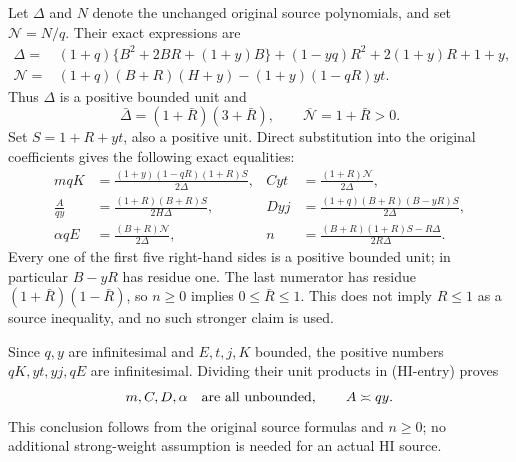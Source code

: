 Let $\Delta$ and $N$ denote the unchanged original source
polynomials, and set $\mathcal N=N/q$. Their exact expressions are
\begin{align*}
\Delta={}&(1+q)\{B^2+2BR+(1+y)B\}
 +(1-yq)R^2+2(1+y)R+1+y,\\
\mathcal N={}&(1+q)(B+R)(H+y)-(1+y)(1-qR)yt.
\end{align*}
Thus $\Delta$ is a positive bounded unit and
\[
 \bar\Delta=(1+\bar R)(3+\bar R),\qquad
 \overline{\mathcal N}=1+\bar R>0.
\]
Set $S=1+R+yt$, also a positive unit. Direct substitution into
the original coefficients gives the following exact equalities:
\[
\begin{aligned}
 mqK&=\frac{(1+y)(1-qR)(1+R)S}{2\Delta},&
 Cyt&=\frac{(1+R)\mathcal N}{2\Delta},\\
 \frac{A}{qy}&=\frac{(1+R)(B+R)S}{2H\Delta},&
 Dyj&=\frac{(1+q)(B+R)(B-yR)S}{2\Delta},\\
 \alpha qE&=\frac{(B+R)\mathcal N}{2\Delta},&
 n&=\frac{(B+R)(1+R)S-R\Delta}{2R\Delta}.
\end{aligned}                                                   \tag{HI-entry}
\]
Every one of the first five right-hand sides is a positive bounded
unit; in particular $B-yR$ has residue one. The last numerator has
residue $(1+\bar R)(1-\bar R)$, so $n\geq0$ implies
$0\le\bar R\le1$. This does not imply $R\le1$ as a source
inequality, and no such stronger claim is used.

Since $q,y$ are infinitesimal and $E,t,j,K$ bounded, the positive
numbers $qK,yt,yj,qE$ are infinitesimal. Dividing their unit
products in (HI-entry) proves
\[
 m,C,D,\alpha\quad\hbox{are all unbounded},\qquad
 A\asymp qy.
\]
This conclusion follows from the original source formulas and
$n\geq0$; no additional strong-weight assumption is needed for
an actual HI source.
